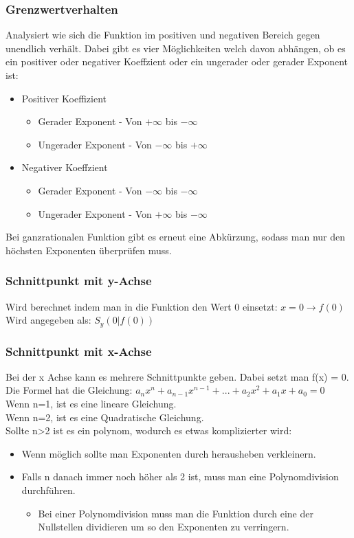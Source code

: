 \documentclass{article}
\begin{document}
	\subsubsection{Grenzwertverhalten}
	Analysiert wie sich die Funktion im positiven und negativen Bereich gegen unendlich verhält. Dabei gibt es vier Möglichkeiten welch davon abhängen, ob es ein positiver oder negativer Koeffzient oder ein ungerader oder gerader Exponent ist:
	\begin{itemize}
		\item{Positiver Koeffizient}
		\begin{itemize}
			\item{Gerader Exponent - Von $+\infty$ bis $-\infty$}
			\item{Ungerader Exponent - Von $-\infty$ bis $+\infty$}
		\end{itemize}
		\item{Negativer Koeffzient}
		\begin{itemize}
			\item{Gerader Exponent - Von $-\infty$ bis $-\infty$}
			\item{Ungerader Exponent - Von $+\infty$ bis $-\infty$}
		\end{itemize}
	\end{itemize}
	Bei ganzrationalen Funktion gibt es erneut eine Abkürzung, sodass man nur den höchsten Exponenten überprüfen muss.
	\subsubsection{Schnittpunkt mit y-Achse}
	Wird berechnet indem man in die Funktion den Wert 0 einsetzt: $x=0\to f(0)$ \\
	Wird angegeben als: $S_y(0|f(0))$
	\subsubsection{Schnittpunkt mit x-Achse}
	Bei der x Achse kann es mehrere Schnittpunkte geben. Dabei setzt man f(x) = 0. \\
	Die Formel hat die Gleichung: $a_nx^n+a_{n-1}x^{n-1}+...+a_2x^2+a_1x+a_0=0$
	Wenn n=1, ist es eine lineare Gleichung. \\
	Wenn n=2, ist es eine Quadratische Gleichung. \\
	Sollte n>2 ist es ein polynom, wodurch es etwas komplizierter wird:
	\begin{itemize}
		\item{Wenn möglich sollte man Exponenten durch herausheben verkleinern.}
		\item{Falls n danach immer noch höher als 2 ist, muss man eine Polynomdivision durchführen.}
		\begin{itemize}
			\item{Bei einer Polynomdivision muss man die Funktion durch eine der Nullstellen dividieren um so den Exponenten zu verringern.}
		\end{itemize}
	\end{itemize}
\end{document}
